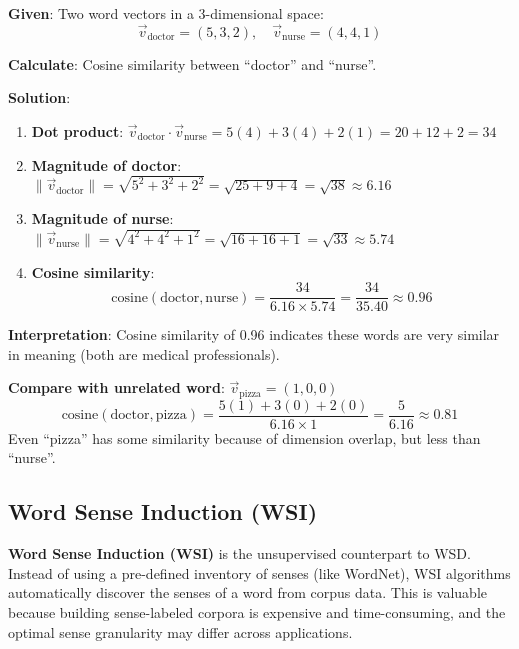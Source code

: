 \documentclass[11pt,a4paper]{article}
\begin{document}
\begin{tcolorbox}[colback=green!5!white,colframe=green!75!black,title=\textbf{Worked Example: Cosine Similarity Computation}]
\textbf{Given}: Two word vectors in a 3-dimensional space:
\[
\vec{v}_{\text{doctor}} = (5, 3, 2), \quad \vec{v}_{\text{nurse}} = (4, 4, 1)
\]

\textbf{Calculate}: Cosine similarity between ``doctor'' and ``nurse''.

\textbf{Solution}:
\begin{enumerate}
    \item \textbf{Dot product}: $\vec{v}_{\text{doctor}} \cdot \vec{v}_{\text{nurse}} = 5(4) + 3(4) + 2(1) = 20 + 12 + 2 = 34$
    
    \item \textbf{Magnitude of doctor}: $\|\vec{v}_{\text{doctor}}\| = \sqrt{5^2 + 3^2 + 2^2} = \sqrt{25 + 9 + 4} = \sqrt{38} \approx 6.16$
    
    \item \textbf{Magnitude of nurse}: $\|\vec{v}_{\text{nurse}}\| = \sqrt{4^2 + 4^2 + 1^2} = \sqrt{16 + 16 + 1} = \sqrt{33} \approx 5.74$
    
    
    \item \textbf{Cosine similarity}:
    \[
    \text{cosine}(\text{doctor}, \text{nurse}) = \frac{34}{6.16 \times 5.74} = \frac{34}{35.40} \approx 0.96
    \]
\end{enumerate}

\textbf{Interpretation}: Cosine similarity of 0.96 indicates these words are very similar in meaning (both are medical professionals).

\textbf{Compare with unrelated word}: $\vec{v}_{\text{pizza}} = (1, 0, 0)$
\[
\text{cosine}(\text{doctor}, \text{pizza}) = \frac{5(1) + 3(0) + 2(0)}{6.16 \times 1} = \frac{5}{6.16} \approx 0.81
\]
Even ``pizza'' has some similarity because of dimension overlap, but less than ``nurse''.
\end{tcolorbox}

\subsection{Word Sense Induction (WSI)}

\textbf{Word Sense Induction (WSI)} is the unsupervised counterpart to WSD. Instead of using a pre-defined inventory of senses (like WordNet), WSI algorithms automatically discover the senses of a word from corpus data. This is valuable because building sense-labeled corpora is expensive and time-consuming, and the optimal sense granularity may differ across applications.
\end{document}
